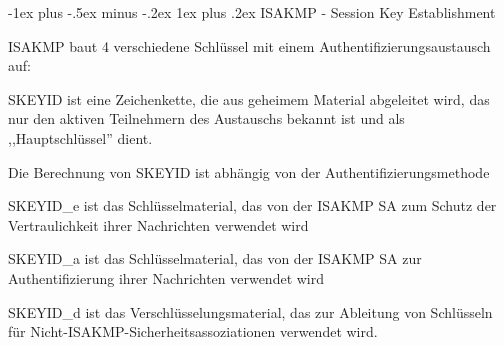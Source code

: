 \documentclass[a4paper]{article}
\makeatletter
\renewcommand{\subsubsection}{\@startsection{subsubsection}{3}{0mm}%
 {-1ex plus -.5ex minus -.2ex}%
 {1ex plus .2ex}%
 {\normalfont\small\bfseries}}
\makeatother
\begin{document}
\begin{multicols}{3}
      \subsubsection{ISAKMP - Session Key Establishment}
      \begin{itemize*}
            \item ISAKMP baut 4 verschiedene Schlüssel mit einem Authentifizierungsaustausch auf:
            \begin{itemize*}
                  \item SKEYID ist eine Zeichenkette, die aus geheimem Material abgeleitet wird, das nur den aktiven Teilnehmern des Austauschs bekannt ist und als ,,Hauptschlüssel'' dient.
                  \item Die Berechnung von SKEYID ist abhängig von der Authentifizierungsmethode
                  \item SKEYID\_e ist das Schlüsselmaterial, das von der ISAKMP SA zum Schutz der Vertraulichkeit ihrer Nachrichten verwendet wird
                  \item SKEYID\_a ist das Schlüsselmaterial, das von der ISAKMP SA zur Authentifizierung ihrer Nachrichten verwendet wird
                  \item SKEYID\_d ist das Verschlüsselungsmaterial, das zur Ableitung von Schlüsseln für Nicht-ISAKMP-Sicherheitsassoziationen verwendet wird.
            \end{itemize*}
      \end{itemize*}


\end{multicols}
\end{document}
